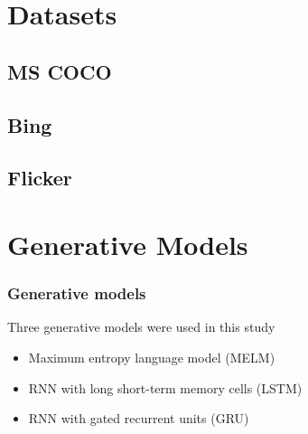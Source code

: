 \documentclass[xcolor=dvipsnames]{beamer}
\begin{document}
	\section{Datasets}
		
		\begin{frame}
			\frametitle{}
			
		\end{frame}
	
		\subsection{MS COCO}
			
			\begin{frame}
				\frametitle{}
				
			\end{frame}
		
		\subsection{Bing}
			
			\begin{frame}
				\frametitle{}
				
			\end{frame}
		
		\subsection{Flicker}
			
			\begin{frame}
				\frametitle{}
				
			\end{frame}
	
	\section{Generative Models}
		
		\begin{frame}
			\frametitle{Generative models}
			Three generative models were used in this study
			\begin{itemize}
				\item Maximum entropy language model (MELM)
				\item RNN with long short-term memory cells (LSTM)
				\item RNN with gated recurrent units (GRU)
			\end{itemize}
		\end{frame}
		
\end{document}

